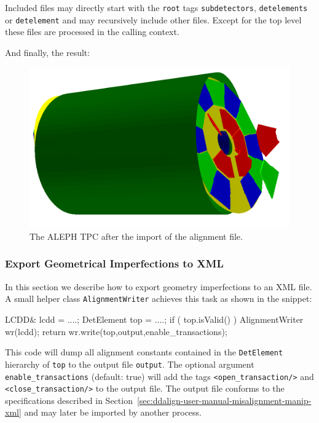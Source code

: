 \documentclass[10pt,a4paper]{article}
\begin{document}
\newpage
\noindent
Included files may directly start with the {\tt root} tags {\tt subdetectors}, 
{\tt detelements} or {\tt detelement} and may recursively include other
files. Except for the top level these files are processed in the calling context.

\vspace{1cm}
\noindent
And finally, the result:
\begin{figure}[h]
  \begin{center}
    \includegraphics[width=160mm] {DDAlign-misaligned-TPC.png}
    \caption{The ALEPH TPC after the import of the alignment file.}
    \label{fig:dd4hep-aligned-hierarchies}
  \end{center}
\end{figure}


\noindent
\subsubsection{Export Geometrical Imperfections to XML}
\label{sec:ddalign-user-misalignment-expotr-xml}
\noindent
In this section we describe how to export geometry imperfections to an XML file.
A small helper class {\tt AlignmentWriter} achieves this task as shown in 
the snippet:
\begin{code}
  LCDD& lcdd = ....;
  DetElement top = ....;
  if ( top.isValid() )   {
    AlignmentWriter wr(lcdd);
    return wr.write(top,output,enable\_transactions);
  }
\end{code}
This code will dump all alignment constants contained in the {\tt DetElement}
hierarchy of {\tt top} to the output file {\tt output}. The optional argument
{\tt enable\_transactions} (default: true) will add the tags 
{\tt <open\_transaction/>} and {\tt <close\_transaction/>} to the output 
file. The output file conforms to the specifications described in 
Section~\ref{sec:ddalign-user-manual-misalignment-manip-xml} and may later
be imported by another process.
\end{document}
